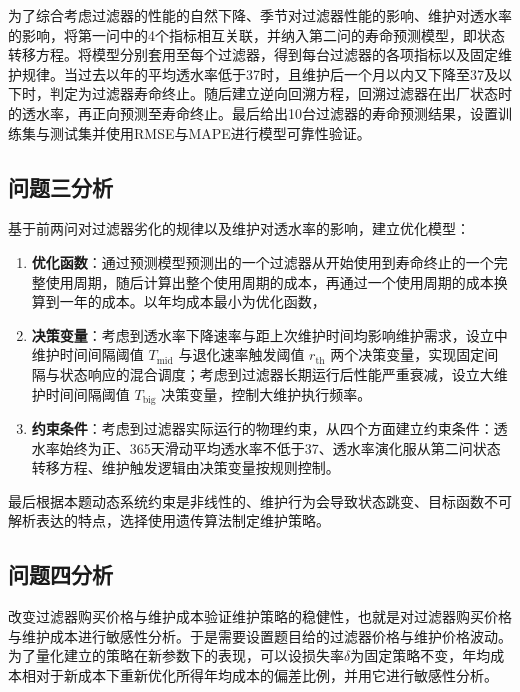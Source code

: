 \documentclass[withoutpreface,bwprint]{cumcmthesis}
\renewcommand{\bfseries}{\CJKfamily{bfsong}}
\begin{document}
为了综合考虑过滤器的性能的自然下降、季节对过滤器性能的影响、维护对透水率的影响，将第一问中的4个指标相互关联，并纳入第二问的寿命预测模型，即状态转移方程。将模型分别套用至每个过滤器，得到每台过滤器的各项指标以及固定维护规律。当过去以年的平均透水率低于37时，且维护后一个月以内又下降至37及以下时，判定为过滤器寿命终止。随后建立逆向回溯方程，回溯过滤器在出厂状态时的透水率，再正向预测至寿命终止。最后给出10台过滤器的寿命预测结果，设置训练集与测试集并使用RMSE与MAPE进行模型可靠性验证。

\subsection{问题三分析}

基于前两问对过滤器劣化的规律以及维护对透水率的影响，建立优化模型：

\begin{enumerate}[label=\bfseries\arabic*.,leftmargin=40pt]
	\item \textbf{优化函数}：通过预测模型预测出的一个过滤器从开始使用到寿命终止的一个完整使用周期，随后计算出整个使用周期的成本，再通过一个使用周期的成本换算到一年的成本。以年均成本最小为优化函数，
	\item \textbf{决策变量}：考虑到透水率下降速率与距上次维护时间均影响维护需求，设立中维护时间间隔阈值 $T_{\text{mid}}$ 与退化速率触发阈值 $r_{\text{th}}$ 两个决策变量，实现固定间隔与状态响应的混合调度；考虑到过滤器长期运行后性能严重衰减，设立大维护时间间隔阈值 $T_{\text{big}}$ 决策变量，控制大维护执行频率。
	
	\item \textbf{约束条件}：考虑到过滤器实际运行的物理约束，从四个方面建立约束条件：透水率始终为正、365天滑动平均透水率不低于37、透水率演化服从第二问状态转移方程、维护触发逻辑由决策变量按规则控制。
\end{enumerate}

最后根据本题动态系统约束是非线性的、维护行为会导致状态跳变、目标函数不可解析表达的特点，选择使用遗传算法制定维护策略。

\subsection{问题四分析}

改变过滤器购买价格与维护成本验证维护策略的稳健性，也就是对过滤器购买价格与维护成本进行敏感性分析。于是需要设置题目给的过滤器价格与维护价格波动。为了量化建立的策略在新参数下的表现，可以设损失率$\delta$为固定策略不变，年均成本相对于新成本下重新优化所得年均成本的偏差比例，并用它进行敏感性分析。
\end{document}
